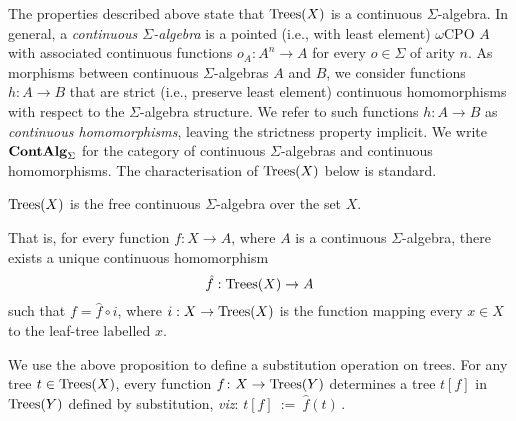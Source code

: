 The properties described above state that $\textnormal{Trees}(X)$ is a continuous $\Sigma$-algebra. In general,
a \emph{continuous $\Sigma$-algebra} is a pointed (i.e., with least element) $\omega$CPO $A$ with associated
continuous functions $o_A : A^n \to A$ for every $o \in \Sigma$ of arity $n$. 
As morphisms between continuous $\Sigma$-algebras
$A$ and $B$, we consider functions $h: A \to B$  that are strict (i.e., preserve least element) continuous homomorphisms with respect to the $\Sigma$-algebra structure. 
We refer to such  functions $h: A \to B$ as \emph{continuous homomorphisms}, leaving the strictness property implicit.
We write $\mathbf{ContAlg}_\Sigma$ for the category of continuous $\Sigma$-algebras and continuous homomorphisms.
The characterisation of $\textnormal{Trees}(X)$ below is standard.
\begin{proposition}
\label{proposition:free}
$\textnormal{Trees}(X)$ is the free
    continuous $\Sigma$-algebra over the set $X$.
   \begin{center}
    \end{center}
    That is, for every function $f : X \to A$, where 
    $A$ is a continuous $\Sigma$-algebra,
    there exists a unique continuous homomorphism $$\hat{f} : \textnormal{Trees}(X) \to A$$
    such that $
        f = \hat{f} \circ i $, where $i : X \to \textnormal{Trees}(X)$ is the function mapping every $x \in X$ to the 
        leaf-tree labelled $x$.
 \end{proposition}
 
 We use the above proposition to define a substitution operation on trees. For any tree $t \in \textnormal{Trees}(X)$, 
 every function $f \colon X \to \textnormal{Trees}(Y)$ determines a tree $t[f]$ in $\textnormal{Trees}(Y)$ defined by substitution, \emph{viz}:
 $t[f] ~ := ~ \hat{f}(t)\,$.
 
